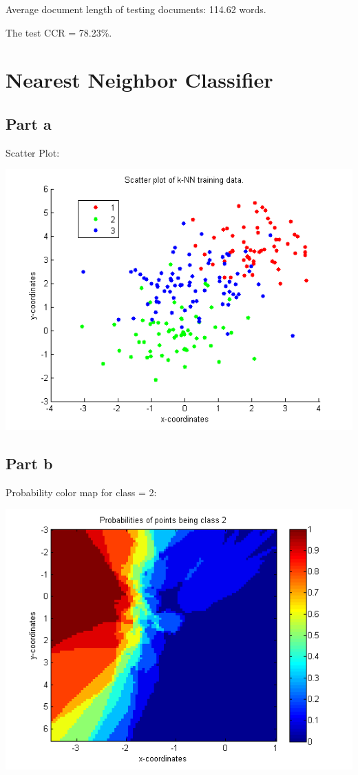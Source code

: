 \documentclass[paper=a4, fontsize=11pt]{scrartcl} %
\numberwithin{equation}{section} %
\numberwithin{figure}{section} %
\numberwithin{table}{section} %
\begin{document}
	Average document length of testing documents: 114.62 words.
	
	The test CCR = 78.23\%.
		
	
	\section{Nearest Neighbor Classifier}
	
	\subsection{Part a}
	Scatter Plot:
	
	\includegraphics{3_a_scatter_plot}
	
	\subsection{Part b}
	Probability color map for class = 2:
	
	\includegraphics{3b_class2}
	
\end{document}
